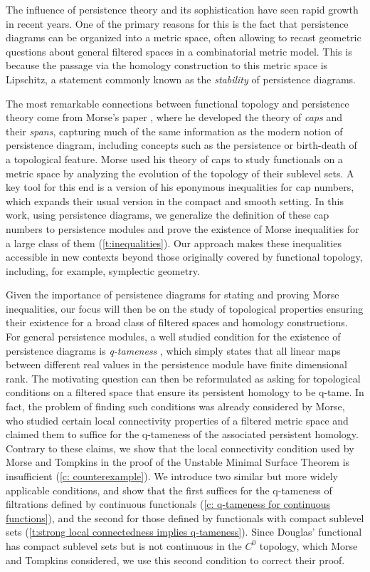 The influence of persistence theory and its sophistication have seen rapid growth in recent years.
One of the primary reasons for this is the fact that persistence diagrams can be organized into a metric space, often allowing to recast geometric questions about general filtered spaces in a combinatorial metric model.
This is because the passage via the homology construction to this metric space is Lipschitz, a statement commonly known as the \textit{stability} of persistence diagrams.

The most remarkable connections between functional topology and persistence theory come from Morse's paper \cite{Morse.1940}, where he developed the theory of \textit{caps} and their \textit{spans}, capturing much of the same information as the modern notion of persistence diagram, including concepts such as the persistence or birth-death of a topological feature.
Morse used his theory of caps to study functionals on a metric space by analyzing the evolution of the topology of their sublevel sets.
A key tool for this end is a version of his eponymous inequalities for cap numbers, which expands their usual version in the compact and smooth setting.
In this work, using persistence diagrams, we generalize  the definition of these cap numbers to persistence modules and prove the existence of Morse inequalities for a large class of them (\cref{t:inequalities}).
Our approach makes these inequalities accessible in new contexts beyond those originally covered by functional topology, including, for example, symplectic geometry.

Given the importance of persistence diagrams for stating and proving Morse inequalities, our focus will then be on the study of topological properties ensuring their existence for a broad class of filtered spaces and homology constructions.
For general persistence modules, a well studied condition for the existence of persistence diagrams is \textit{q-tameness} \cite{Chazal.2016a,Chazal.2016b}, which simply states that all linear maps between different real values in the persistence module have finite dimensional rank.
The motivating question can then be reformulated as asking for topological conditions on a filtered space that ensure its persistent homology to be q-tame.
In fact, the problem of finding such conditions was already considered by Morse, who studied certain local connectivity properties of a filtered metric space and claimed them to suffice for the q-tameness of the associated persistent homology.
Contrary to these claims, we show that the local connectivity condition used by Morse and Tompkins in the proof of the Unstable Minimal Surface Theorem is insufficient (\cref{c: counterexample}).
We introduce two similar but more widely applicable conditions, and show that the first suffices for the \mbox{q-tameness} of filtrations defined by continuous functionals (\cref{c: q-tameness for continuous functions}), and the second for those defined by functionals with compact sublevel sets (\cref{t:strong local connectedness implies q-tameness}).
Since Douglas' functional has compact sublevel sets but is not continuous in the $C^0$ topology, which Morse and Tompkins considered, we use this second condition to correct their proof.

